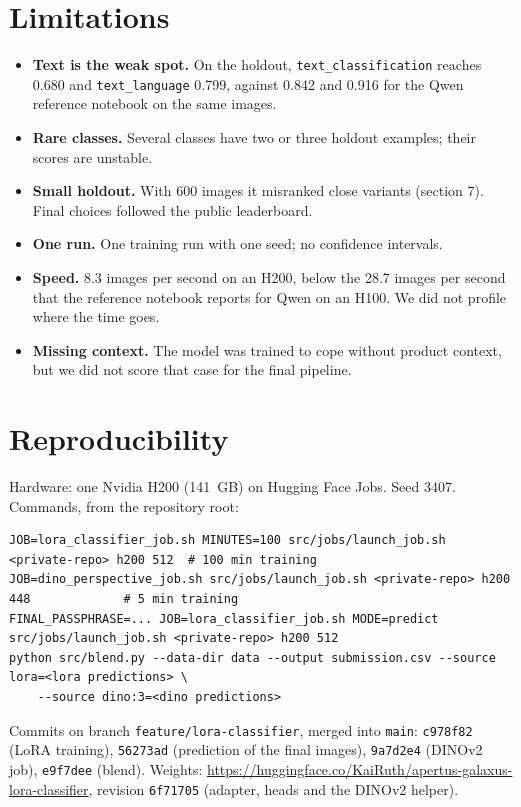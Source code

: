 \documentclass[10pt,a4paper]{article}
\newcommand{\code}[1]{\texttt{#1}}
\begin{document}
\section{Limitations}

\begin{itemize}
\item \textbf{Text is the weak spot.} On the holdout, \code{text\_classification} reaches 0.680 and
\code{text\_language} 0.799, against 0.842 and 0.916 for the Qwen reference notebook on the same images.
\item \textbf{Rare classes.} Several classes have two or three holdout examples; their scores are unstable.
\item \textbf{Small holdout.} With 600 images it misranked close variants (section 7). Final choices followed the
public leaderboard.
\item \textbf{One run.} One training run with one seed; no confidence intervals.
\item \textbf{Speed.} 8.3 images per second on an H200, below the 28.7 images per second that the reference
notebook reports for Qwen on an H100. We did not profile where the time goes.
\item \textbf{Missing context.} The model was trained to cope without product context, but we did not score that
case for the final pipeline.
\end{itemize}

\section{Reproducibility}

Hardware: one Nvidia H200 (141~GB) on Hugging Face Jobs. Seed 3407. Commands, from the repository root:

{\footnotesize
\begin{verbatim}
JOB=lora_classifier_job.sh MINUTES=100 src/jobs/launch_job.sh <private-repo> h200 512  # 100 min training
JOB=dino_perspective_job.sh src/jobs/launch_job.sh <private-repo> h200 448             # 5 min training
FINAL_PASSPHRASE=... JOB=lora_classifier_job.sh MODE=predict src/jobs/launch_job.sh <private-repo> h200 512
python src/blend.py --data-dir data --output submission.csv --source lora=<lora predictions> \
    --source dino:3=<dino predictions>
\end{verbatim}}

Commits on branch \code{feature/lora-classifier}, merged into \code{main}: \code{c978f82} (LoRA training),
\code{56273ad} (prediction of the final images), \code{9a7d2e4} (DINOv2 job), \code{e9f7dee} (blend). Weights:
\url{https://huggingface.co/KaiRuth/apertus-galaxus-lora-classifier}, revision \code{6f71705} (adapter, heads
and the DINOv2 helper).
\end{document}
